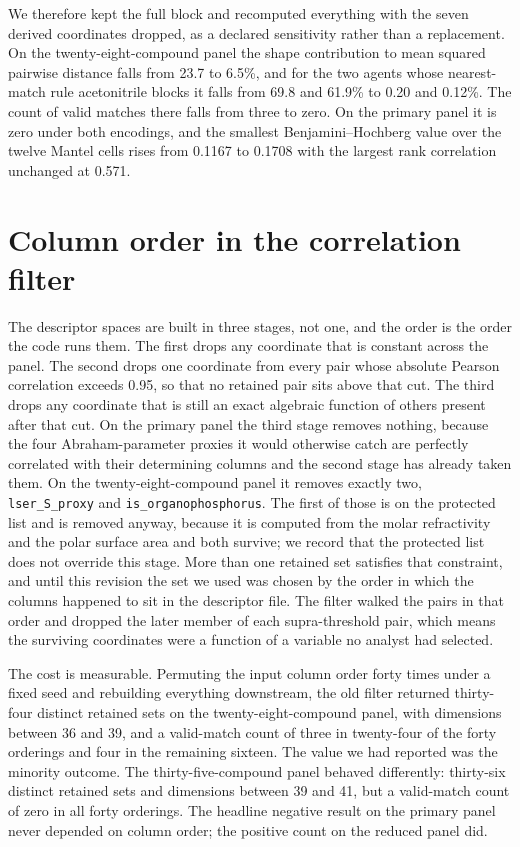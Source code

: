 \documentclass[journal=jacsat,manuscript=suppinfo,margin=1in]{achemso}
\begin{document}
We therefore kept the full block and recomputed everything with the seven
derived coordinates dropped, as a declared sensitivity rather than a
replacement. On the twenty-eight-compound panel the shape contribution to
mean squared pairwise distance falls from 23.7 to 6.5\%, and for the two
agents whose nearest-match rule acetonitrile blocks it falls from 69.8 and
61.9\% to 0.20 and 0.12\%. The count of valid matches there falls from
three to zero. On the primary panel it is zero under both encodings, and the
smallest Benjamini--Hochberg value over the twelve Mantel cells rises from
0.1167 to 0.1708 with the largest rank correlation unchanged at 0.571.

\section{Column order in the correlation filter}
\label{meth:orderinvariance}

The descriptor spaces are built in three stages, not one, and the order is
the order the code runs them. The first drops any coordinate that is constant
across the panel. The second drops one coordinate from every pair whose
absolute Pearson correlation exceeds 0.95, so that no retained pair sits above
that cut. The third drops any coordinate that is still an exact algebraic
function of others present after that cut. On the primary panel the third
stage removes nothing, because the four Abraham-parameter proxies it would
otherwise catch are perfectly correlated with their determining columns and
the second stage has already taken them. On the twenty-eight-compound panel it
removes exactly two, \texttt{lser\_S\_proxy} and
\texttt{is\_organophosphorus}. The first of those is on the protected list
and is removed anyway, because it is computed from the molar refractivity and
the polar surface area and both survive; we record that the protected list
does not override this stage. More than one retained set satisfies that constraint, and until this
revision the set we used was chosen by the order in which the columns happened
to sit in the descriptor file. The filter walked the pairs in that order and
dropped the later member of each supra-threshold pair, which means the surviving
coordinates were a function of a variable no analyst had selected.

The cost is measurable. Permuting the input column order forty times under a
fixed seed and rebuilding everything downstream, the old filter returned
thirty-four distinct retained sets on the twenty-eight-compound panel, with
dimensions between 36 and 39, and a valid-match count of three in twenty-four
of the forty orderings and four in the remaining sixteen. The value we had
reported was the minority outcome. The thirty-five-compound panel behaved
differently: thirty-six distinct retained sets and dimensions between 39 and 41,
but a valid-match count of zero in all forty orderings. The headline negative
result on the primary panel never depended on column order; the positive count
on the reduced panel did.
\end{document}

